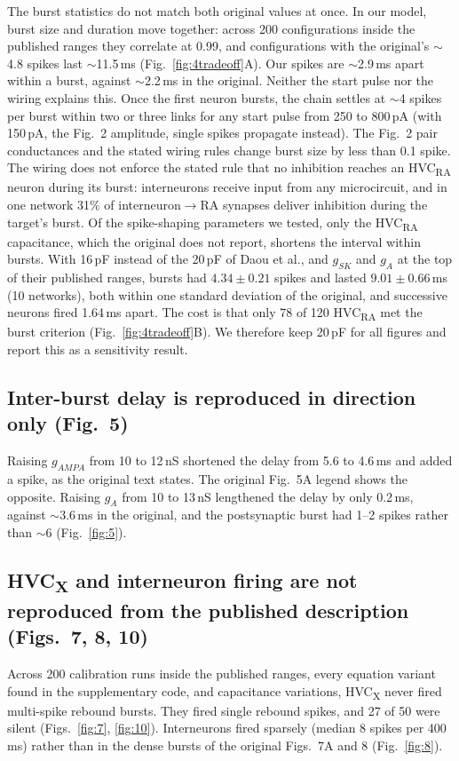 The burst statistics do not match both original values at once. In our model, burst size and
duration move together: across 200 configurations inside the published ranges they correlate at
0.99, and configurations with the original's $\sim$4.8 spikes last $\sim$11.5\,ms
(Fig.~\ref{fig:4tradeoff}A). Our spikes are $\sim$2.9\,ms apart within a burst, against
$\sim$2.2\,ms in the original. Neither the start pulse nor the wiring explains this. Once the first
neuron bursts, the chain settles at $\sim$4 spikes per burst within two or three links for any
start pulse from 250 to 800\,pA (with 150\,pA, the Fig.~2 amplitude, single spikes propagate
instead). The Fig.~2 pair conductances and the stated wiring rules change burst size by less than
0.1 spike. The wiring does not enforce the stated rule that no inhibition reaches an
HVC\textsubscript{RA} neuron during its burst: interneurons receive input from any microcircuit,
and in one network 31\% of interneuron$\to$RA synapses deliver inhibition during the target's
burst. Of the spike-shaping parameters we tested, only the HVC\textsubscript{RA} capacitance,
which the original does not report, shortens the interval within bursts. With 16\,pF instead of
the 20\,pF of Daou et al.\supercite{Daou2013}, and $g_{SK}$ and $g_A$ at the top of their published
ranges, bursts had $4.34\pm0.21$ spikes and lasted $9.01\pm0.66$\,ms (10 networks), both within
one standard deviation of the original, and successive neurons fired 1.64\,ms apart. The cost is
that only 78 of 120 HVC\textsubscript{RA} met the burst criterion (Fig.~\ref{fig:4tradeoff}B).
We therefore keep 20\,pF for all figures and report this as a sensitivity result.

\subsection*{Inter-burst delay is reproduced in direction only (Fig.~5)}
Raising $g_{AMPA}$ from 10 to 12\,nS shortened the delay from 5.6 to 4.6\,ms and added a spike,
as the original text states. The original Fig.~5A legend shows the opposite. Raising $g_A$ from
10 to 13\,nS lengthened the delay by only 0.2\,ms, against $\sim$3.6\,ms in the original, and the
postsynaptic burst had 1--2 spikes rather than $\sim$6 (Fig.~\ref{fig:5}).

\subsection*{HVC\textsubscript{X} and interneuron firing are not reproduced from the published description (Figs.~7, 8, 10)}
Across 200 calibration runs inside the published ranges, every equation variant found in the
supplementary code, and capacitance variations, HVC\textsubscript{X} never fired multi-spike
rebound bursts. They fired single rebound spikes, and 27 of 50 were silent
(Figs.~\ref{fig:7}, \ref{fig:10}). Interneurons fired sparsely (median 8 spikes per 400\,ms)
rather than in the dense bursts of the original Figs.~7A and 8 (Fig.~\ref{fig:8}).

